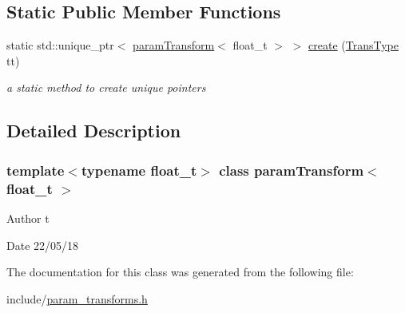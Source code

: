 \subsection*{Static Public Member Functions}
\begin{DoxyCompactItemize}
\item 
\mbox{\label{classparamTransform_af9a8ce5938cb694001e0227322b6c1c3}} 
static std\+::unique\+\_\+ptr$<$ \hyperlink{classparamTransform}{param\+Transform}$<$ float\+\_\+t $>$ $>$ \hyperlink{classparamTransform_af9a8ce5938cb694001e0227322b6c1c3}{create} (\hyperlink{param__transforms_8h_acee593b112f4fc85f850631b9c6aaae9}{Trans\+Type} tt)
\begin{DoxyCompactList}\small\item\em a static method to create unique pointers \end{DoxyCompactList}\end{DoxyCompactItemize}


\subsection{Detailed Description}
\subsubsection*{template$<$typename float\+\_\+t$>$\newline
class param\+Transform$<$ float\+\_\+t $>$}

\begin{DoxyAuthor}{Author}
t 
\end{DoxyAuthor}
\begin{DoxyDate}{Date}
22/05/18 
\end{DoxyDate}


The documentation for this class was generated from the following file\+:\begin{DoxyCompactItemize}
\item 
include/\hyperlink{param__transforms_8h}{param\+\_\+transforms.\+h}\end{DoxyCompactItemize}
